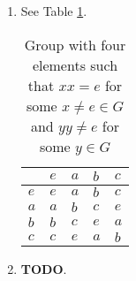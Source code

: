 \begin{enumerate}
\begin{table}[!ht]
            \caption{Group with four elements such that $xx = e$ for every $x \in G$}
            \label{tab:group-4-self-inverses}
        \end{table}
    \item See Table \ref{tab:group-4-one-not-self-inverse}.
        \begin{table}[]
            \centering
            \begin{tabular}{l|llll}
            &$e$&$a$&$b$&$c$\\ \hline
            $e$&$e$&$a$&$b$&$c$\\
            $a$&$a$&$b$&$c$&$e$\\
            $b$&$b$&$c$&$e$&$a$\\
            $c$&$c$&$e$&$a$&$b$
            \end{tabular}
            \caption{Group with four elements such that $xx = e$ for some $x \ne e \in G$ and $yy \ne e$ for some $y \in G$}
            \label{tab:group-4-one-not-self-inverse}
        \end{table}
    \item \textbf{TODO}.
\end{enumerate}

